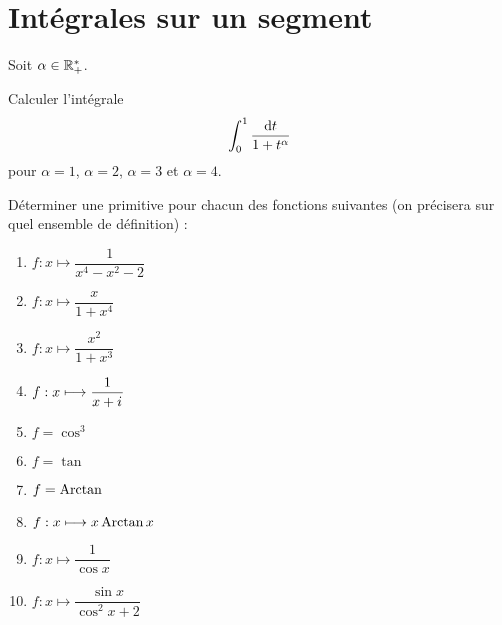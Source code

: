 \chapter{Intégrales sur un segment}

\minitoc

\begin{exo}
Soit \(\alpha\in\mathbb{R}_+^*\).

Calculer l'intégrale \[\int_0^1\dfrac{\odif{t}}{1+t^{\alpha}}\] pour \(\alpha=1\), \(\alpha=2\), \(\alpha=3\) et \(\alpha=4\).
\end{exo}

\begin{corr}
\end{corr}

\begin{exo}
Déterminer une primitive pour chacun des fonctions suivantes (on précisera sur quel ensemble de définition) :

\begin{enumerate}
\item \(f:x\mapsto\dfrac{1}{x^4-x^2-2}\) \\

\item \(f:x\mapsto\dfrac{x}{1+x^4}\) \\

\item \(f:x\mapsto\dfrac{x^2}{1+x^3}\) \\

\item \(f:x\longmapsto\dfrac{1}{x+i\mkern1mu}\) \\

\item \(f=\cos^3\) \\

\item \(f=\tan\) \\

\item \(f=\operatorname{Arctan}\) \\

\item \(f:x\longmapsto x\operatorname{Arctan} x\) \\

\item \(f:x\mapsto\dfrac{1}{\cos x}\) \\

\item \(f:x\mapsto\dfrac{\sin x}{\cos^2x+2}\) \\


\end{enumerate}
\end{exo}
